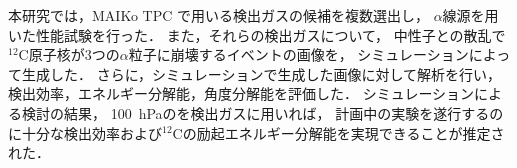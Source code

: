 \documentclass[./master]{subfiles}
\begin{document}
  本研究では，MAIKo TPC で用いる検出ガスの候補を複数選出し，
  $\alpha$線源を用いた性能試験を行った．
  また，それらの検出ガスについて，
  中性子との散乱で${}^{12}\mathrm{C}$原子核が3つの$\alpha$粒子に崩壊するイベントの画像を，
  シミュレーションによって生成した．
  さらに，シミュレーションで生成した画像に対して解析を行い，
  検出効率，エネルギー分解能，角度分解能を評価した．
  シミュレーションによる検討の結果，
  \SI{100}{\hecto\pascal}の\isoButaneHydro を検出ガスに用いれば，
  計画中の実験を遂行するのに十分な検出効率および${}^{12}\mathrm{C}$の励起エネルギー分解能を実現できることが推定された．
\end{document}
